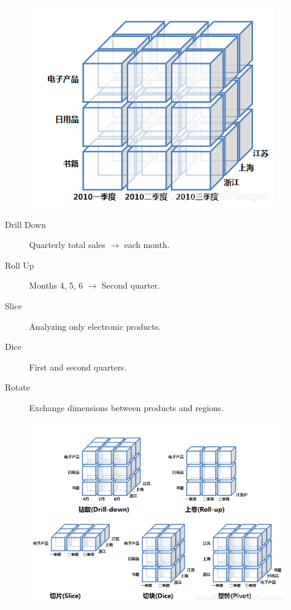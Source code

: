 \documentclass[11pt,journal,compsoc]{IEEEtran}
\begin{document}
\begin{figure}[H]
    \centering
    \includegraphics[width=\linewidth]{Cube.png}
\end{figure}

\begin{description}
    \item[Drill Down] Quarterly total sales $\to$ each month.
    
    \item[Roll Up] Months 4, 5, 6 $\to$ Second quarter.
    
    \item[Slice] Analyzing only electronic products.
    
    \item[Dice] First and second quarters.
    
    \item[Rotate] Exchange dimensions between products and regions.
\end{description}

\begin{figure}[H]
    \centering
    \includegraphics[width=\linewidth]{Action.png}
\end{figure}
\end{document}

